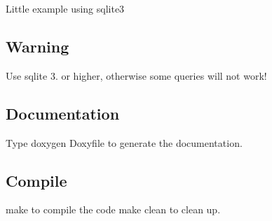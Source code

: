 Little example using sqlite3

\subsection*{Warning}

Use sqlite 3. or higher, otherwise some queries will not work!

\subsection*{Documentation}

Type {\ttfamily doxygen Doxyfile} to generate the documentation.

\subsection*{Compile}

{\ttfamily make} to compile the code {\ttfamily make clean} to clean up. 